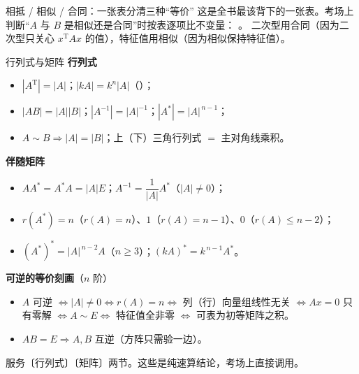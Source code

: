 \begin{fdeep}{相抵 / 相似 / 合同：一张表分清三种“等价”}
\fbref{}这是全书最该背下的一张表。考场上判断“$A$ 与 $B$ 是相似还是合同”时按表逐项比不变量：
。
二次型用合同（因为二次型只关心 $x^{\mathrm T}Ax$ 的值），特征值用相似（因为相似保持特征值）。
\end{fdeep}


\begin{fdeep}{行列式与矩阵}
\textbf{行列式}
\begin{itemize}[leftmargin=2.2em,itemsep=0.2em]
\item $|A^{\mathrm T}|=|A|$；$|kA|=k^{n}|A|$（）；
\item $|AB|=|A||B|$；$|A^{-1}|=|A|^{-1}$；$|A^{*}|=|A|^{\,n-1}$；
\item $A\sim B\Rightarrow|A|=|B|$；上（下）三角行列式 $=$ 主对角线乘积。
\end{itemize}
\textbf{伴随矩阵}
\begin{itemize}[leftmargin=2.2em,itemsep=0.2em]
\item $AA^{*}=A^{*}A=|A|E$；$A^{-1}=\dfrac{1}{|A|}A^{*}$（$|A|\ne0$）；
\item $r(A^{*})=n$（$r(A)=n$）、$1$（$r(A)=n-1$）、$0$（$r(A)\le n-2$）；
\item $(A^{*})^{*}=|A|^{\,n-2}A$（$n\ge3$）；$(kA)^{*}=k^{\,n-1}A^{*}$。
\end{itemize}
\textbf{可逆的等价刻画}（$n$ 阶）
\begin{itemize}[leftmargin=2.2em,itemsep=0.2em]
\item $A$ 可逆 $\iff|A|\ne0\iff r(A)=n\iff$ 列（行）向量组线性无关
      $\iff Ax=0$ 只有零解 $\iff A\sim E\iff$ 特征值全非零 $\iff$ 可表为初等矩阵之积。
\item $AB=E\Rightarrow A,B$ 互逆（方阵只需验一边）。
\end{itemize}
\fbref{}服务〔行列式〕〔矩阵〕两节。这些是纯速算结论，考场上直接调用。
\end{fdeep}

